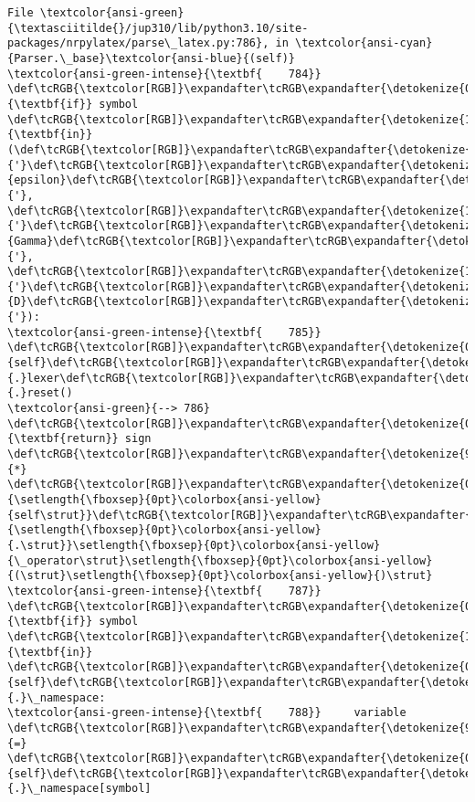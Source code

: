 \documentclass[landscape,letterpaper,10pt,english]{article}
\begin{document}
\begin{Verbatim}[commandchars=\\\{\}, frame=single, framerule=2mm, rulecolor=\color{outerrorbackground}]
File \textcolor{ansi-green}{\textasciitilde{}/jup310/lib/python3.10/site-packages/nrpylatex/parse\_latex.py:786}, in \textcolor{ansi-cyan}{Parser.\_base}\textcolor{ansi-blue}{(self)}
\textcolor{ansi-green-intense}{\textbf{    784}} \def\tcRGB{\textcolor[RGB]}\expandafter\tcRGB\expandafter{\detokenize{0,135,0}}{\textbf{if}} symbol \def\tcRGB{\textcolor[RGB]}\expandafter\tcRGB\expandafter{\detokenize{175,0,255}}{\textbf{in}} (\def\tcRGB{\textcolor[RGB]}\expandafter\tcRGB\expandafter{\detokenize{175,0,0}}{'}\def\tcRGB{\textcolor[RGB]}\expandafter\tcRGB\expandafter{\detokenize{175,0,0}}{epsilon}\def\tcRGB{\textcolor[RGB]}\expandafter\tcRGB\expandafter{\detokenize{175,0,0}}{'}, \def\tcRGB{\textcolor[RGB]}\expandafter\tcRGB\expandafter{\detokenize{175,0,0}}{'}\def\tcRGB{\textcolor[RGB]}\expandafter\tcRGB\expandafter{\detokenize{175,0,0}}{Gamma}\def\tcRGB{\textcolor[RGB]}\expandafter\tcRGB\expandafter{\detokenize{175,0,0}}{'}, \def\tcRGB{\textcolor[RGB]}\expandafter\tcRGB\expandafter{\detokenize{175,0,0}}{'}\def\tcRGB{\textcolor[RGB]}\expandafter\tcRGB\expandafter{\detokenize{175,0,0}}{D}\def\tcRGB{\textcolor[RGB]}\expandafter\tcRGB\expandafter{\detokenize{175,0,0}}{'}):
\textcolor{ansi-green-intense}{\textbf{    785}}     \def\tcRGB{\textcolor[RGB]}\expandafter\tcRGB\expandafter{\detokenize{0,135,0}}{self}\def\tcRGB{\textcolor[RGB]}\expandafter\tcRGB\expandafter{\detokenize{98,98,98}}{.}lexer\def\tcRGB{\textcolor[RGB]}\expandafter\tcRGB\expandafter{\detokenize{98,98,98}}{.}reset()
\textcolor{ansi-green}{--> 786}     \def\tcRGB{\textcolor[RGB]}\expandafter\tcRGB\expandafter{\detokenize{0,135,0}}{\textbf{return}} sign \def\tcRGB{\textcolor[RGB]}\expandafter\tcRGB\expandafter{\detokenize{98,98,98}}{*} \def\tcRGB{\textcolor[RGB]}\expandafter\tcRGB\expandafter{\detokenize{0,135,0}}{\setlength{\fboxsep}{0pt}\colorbox{ansi-yellow}{self\strut}}\def\tcRGB{\textcolor[RGB]}\expandafter\tcRGB\expandafter{\detokenize{98,98,98}}{\setlength{\fboxsep}{0pt}\colorbox{ansi-yellow}{.\strut}}\setlength{\fboxsep}{0pt}\colorbox{ansi-yellow}{\_operator\strut}\setlength{\fboxsep}{0pt}\colorbox{ansi-yellow}{(\strut}\setlength{\fboxsep}{0pt}\colorbox{ansi-yellow}{)\strut}
\textcolor{ansi-green-intense}{\textbf{    787}} \def\tcRGB{\textcolor[RGB]}\expandafter\tcRGB\expandafter{\detokenize{0,135,0}}{\textbf{if}} symbol \def\tcRGB{\textcolor[RGB]}\expandafter\tcRGB\expandafter{\detokenize{175,0,255}}{\textbf{in}} \def\tcRGB{\textcolor[RGB]}\expandafter\tcRGB\expandafter{\detokenize{0,135,0}}{self}\def\tcRGB{\textcolor[RGB]}\expandafter\tcRGB\expandafter{\detokenize{98,98,98}}{.}\_namespace:
\textcolor{ansi-green-intense}{\textbf{    788}}     variable \def\tcRGB{\textcolor[RGB]}\expandafter\tcRGB\expandafter{\detokenize{98,98,98}}{=} \def\tcRGB{\textcolor[RGB]}\expandafter\tcRGB\expandafter{\detokenize{0,135,0}}{self}\def\tcRGB{\textcolor[RGB]}\expandafter\tcRGB\expandafter{\detokenize{98,98,98}}{.}\_namespace[symbol]


\end{Verbatim}
\end{document}
